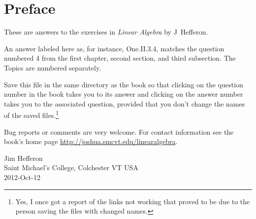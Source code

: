 \documentclass[twoside]{book}
\begin{document}

\frontmatter
\chapter*{Preface}
These are answers to the exercises in \textit{Linear Algebra} by
J~Hef{}feron.

An answer labeled here as, for instance,
One.II.3.4, matches the question numbered 4 
from the first chapter,
second section, and third subsection.
The Topics are numbered separately.

Save this file in the same directory as the book
so that clicking on the question number in the book takes you to its answer
and clicking on the answer number takes you to the associated question, 
provided that you don't change the names of the saved 
files.\footnote{Yes, I once got a report of the links
not working that proved to be due to the person 
saving the files with changed names.}

Bug reports or comments are very welcome.
For contact information see the book's home page 
\url{http://joshua.smcvt.edu/linearalgebra}.

\vspace{.5in}
\begin{raggedright}
Jim Hef{}feron     \\
Saint Michael's College, Colchester VT USA \\
2012-Oct-12  
\end{raggedright}
\clearemptydoublepage\tableofcontents
\setcounter{page}{1}
\mainmatter
\thispagestyle{empty}

\end{document}
